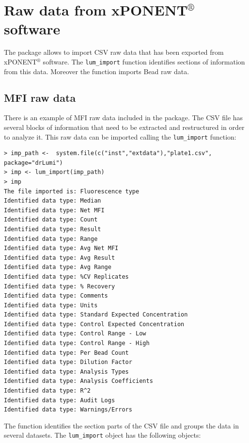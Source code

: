 \documentclass[11pt]{article}\usepackage[]{graphicx}\usepackage[]{color}
\makeatletter
\newenvironment{kframe}{%
 \def\at@end@of@kframe{}%
 \ifinner\ifhmode%
  \def\at@end@of@kframe{\end{minipage}}%
  \begin{minipage}{\columnwidth}%
 \fi\fi%
 \def\FrameCommand##1{\hskip\@totalleftmargin \hskip-\fboxsep
 \colorbox{shadecolor}{##1}\hskip-\fboxsep
     \hskip-\linewidth \hskip-\@totalleftmargin \hskip\columnwidth}%
 \MakeFramed {\advance\hsize-\width
   \@totalleftmargin\z@ \linewidth\hsize
   \@setminipage}}%
 {\par\unskip\endMakeFramed%
 \at@end@of@kframe}
\newenvironment{knitrout}{}{} %
\makeatother
\begin{document}
\section{Raw data from xPONENT$^\circledR$ software}
\label{sec:xponent}
The package allows to import CSV raw data that has been exported from 
xPONENT$^\circledR$ software. The {\tt lum\_import} function identifies sections of 
information from this data. Moreover the function imports Bead raw 
data. 

\subsection{MFI raw data}
\noindent There is an example of MFI raw data included in the package. The CSV 
file has several blocks of information that need to be extracted and 
restructured in order to analyze it. This raw data can be imported calling 
the {\tt lum\_import} function:

\begin{knitrout}
\color{fgcolor}\begin{kframe}
\begin{verbatim}
> imp_path <-  system.file(c("inst","extdata"),"plate1.csv", package="drLumi")
> imp <- lum_import(imp_path)
> imp
The file imported is: Fluorescence type 
Identified data type: Median 
Identified data type: Net MFI 
Identified data type: Count 
Identified data type: Result 
Identified data type: Range 
Identified data type: Avg Net MFI 
Identified data type: Avg Result 
Identified data type: Avg Range 
Identified data type: %CV Replicates 
Identified data type: % Recovery 
Identified data type: Comments 
Identified data type: Units 
Identified data type: Standard Expected Concentration 
Identified data type: Control Expected Concentration 
Identified data type: Control Range - Low 
Identified data type: Control Range - High 
Identified data type: Per Bead Count 
Identified data type: Dilution Factor 
Identified data type: Analysis Types 
Identified data type: Analysis Coefficients 
Identified data type: R^2 
Identified data type: Audit Logs 
Identified data type: Warnings/Errors 
\end{verbatim}
\end{kframe}
\end{knitrout}

\noindent The function identifies the section parts of the CSV file and groups 
the data in several datasets. The {\tt lum\_import} object has the 
following objects:
\end{document}
